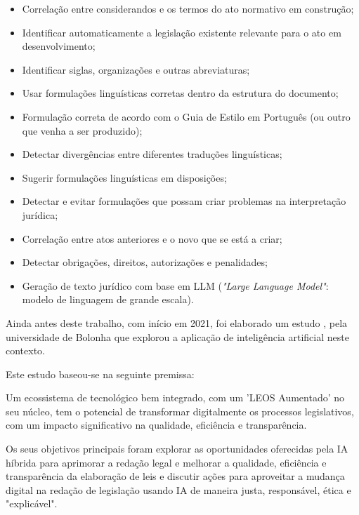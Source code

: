 \begin{itemize}
    \item Correlação entre considerandos e os termos do ato normativo em construção;
    \item Identificar automaticamente a legislação existente relevante para o ato em desenvolvimento;
    \item Identificar siglas, organizações e outras abreviaturas;
    \item Usar formulações linguísticas corretas dentro da estrutura do documento;
    \item Formulação correta de acordo com o Guia de Estilo em Português (ou outro que venha a ser produzido);
    \item Detectar divergências entre diferentes traduções linguísticas;
    \item Sugerir formulações linguísticas em disposições;
    \item Detectar e evitar formulações que possam criar problemas na interpretação jurídica;
    \item Correlação entre atos anteriores e o novo que se está a criar;
    \item Detectar obrigações, direitos, autorizações e  penalidades;
    \item Geração de texto jurídico com base em LLM (\emph{"Large Language Model"}: modelo de linguagem de grande escala).
\end{itemize}

Ainda antes deste trabalho, com início em 2021, foi elaborado um estudo \cite{PFPD22}, 
pela universidade de Bolonha que explorou a aplicação de inteligência artificial neste contexto.

Este estudo baseou-se na seguinte premissa:

\begin{quoting}
    Um ecossistema de tecnológico bem integrado, com um 'LEOS Aumentado' no seu núcleo, 
    tem o potencial de transformar digitalmente os processos legislativos, com um impacto 
    significativo na qualidade, eficiência e transparência.
\end{quoting}

Os seus objetivos principais foram explorar as oportunidades oferecidas pela IA híbrida para aprimorar 
a redação legal e melhorar a qualidade, eficiência e transparência da elaboração de leis e discutir 
ações para aproveitar a mudança digital na redação de legislação usando IA de maneira justa, 
responsável, ética e "explicável". 

